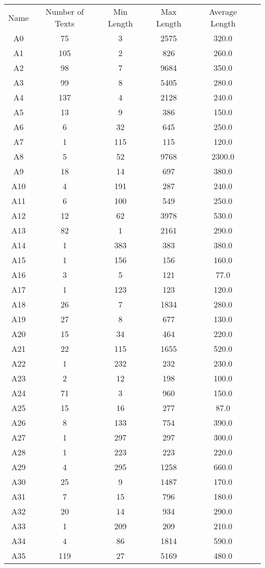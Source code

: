 \begin{tabular}{cccccc}
 Name & Number of Texts & Min Length& Max Length & Average Length\\
A0 & 75 & 3 & 2575 & 320.0\\
A1 & 105 & 2 & 826 & 260.0\\
A2 & 98 & 7 & 9684 & 350.0\\
A3 & 99 & 8 & 5405 & 280.0\\
A4 & 137 & 4 & 2128 & 240.0\\
A5 & 13 & 9 & 386 & 150.0\\
A6 & 6 & 32 & 645 & 250.0\\
A7 & 1 & 115 & 115 & 120.0\\
A8 & 5 & 52 & 9768 & 2300.0\\
A9 & 18 & 14 & 697 & 380.0\\
A10 & 4 & 191 & 287 & 240.0\\
A11 & 6 & 100 & 549 & 250.0\\
A12 & 12 & 62 & 3978 & 530.0\\
A13 & 82 & 1 & 2161 & 290.0\\
A14 & 1 & 383 & 383 & 380.0\\
A15 & 1 & 156 & 156 & 160.0\\
A16 & 3 & 5 & 121 & 77.0\\
A17 & 1 & 123 & 123 & 120.0\\
A18 & 26 & 7 & 1834 & 280.0\\
A19 & 27 & 8 & 677 & 130.0\\
A20 & 15 & 34 & 464 & 220.0\\
A21 & 22 & 115 & 1655 & 520.0\\
A22 & 1 & 232 & 232 & 230.0\\
A23 & 2 & 12 & 198 & 100.0\\
A24 & 71 & 3 & 960 & 150.0\\
A25 & 15 & 16 & 277 & 87.0\\
A26 & 8 & 133 & 754 & 390.0\\
A27 & 1 & 297 & 297 & 300.0\\
A28 & 1 & 223 & 223 & 220.0\\
A29 & 4 & 295 & 1258 & 660.0\\
A30 & 25 & 9 & 1487 & 170.0\\
A31 & 7 & 15 & 796 & 180.0\\
A32 & 20 & 14 & 934 & 290.0\\
A33 & 1 & 209 & 209 & 210.0\\
A34 & 4 & 86 & 1814 & 590.0\\
A35 & 119 & 27 & 5169 & 480.0\\
\end{tabular}
